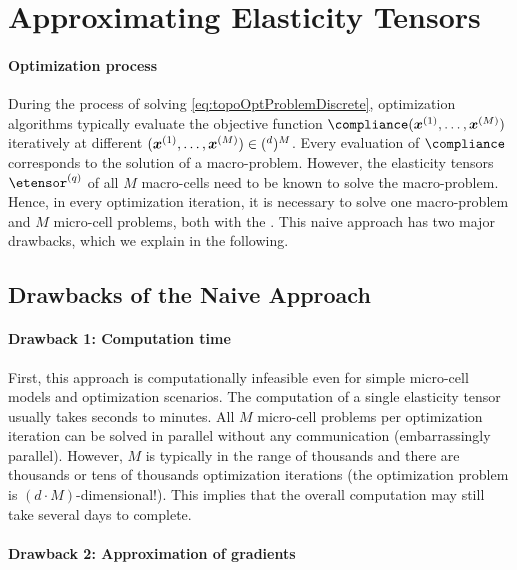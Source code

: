 \section{Approximating Elasticity Tensors}
\label{sec:62tensors}

\paragraph{Optimization process}

During the process of solving \eqref{eq:topoOptProblemDiscrete},
optimization algorithms typically
evaluate the objective function $\compliance(\*x^{(1)}, \dotsc, \*x^{(M)})$
iteratively at different 
$(\*x^{(1)}, \dotsc, \*x^{(M)}) \in (\real^d)^M$.
Every evaluation of $\compliance$ corresponds to the solution of a
macro-problem.
However, the elasticity tensors $\etensor^{(q)}$ of all $M$ macro-cells
need to be known to solve the macro-problem.
Hence, in every optimization iteration, it is necessary to solve
one macro-problem and $M$ micro-cell problems,
both with the \fem.
This naive approach has two major drawbacks, which we explain in
the following.



\subsection{Drawbacks of the Naive Approach}
\label{sec:621drawbacks}

\paragraph{Drawback 1: Computation time}

First, this approach is computationally infeasible
even for simple micro-cell models and optimization scenarios.
The computation of a single elasticity tensor usually takes seconds to
minutes.
All $M$ micro-cell problems per optimization iteration
can be solved in parallel without any
communication (embarrassingly parallel).
However, $M$ is typically in the range of thousands and
there are thousands or tens of thousands optimization iterations
(the optimization problem is $(d \cdot M)$-dimensional!).
This implies that the overall computation may still take
several days to complete.

\paragraph{Drawback 2: Approximation of gradients}

